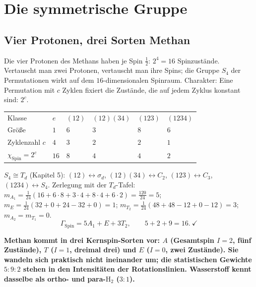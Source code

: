 \chapter{Die symmetrische Gruppe}

\section{Vier Protonen, drei Sorten Methan}

\begin{merksatz}
Die vier Protonen des Methans haben je Spin $\tfrac12$: $2^{4} = 16$ Spinzustände. Vertauscht man zwei Protonen, vertauscht man ihre Spins; die Gruppe $S_4$ der Permutationen wirkt auf dem $16$-dimensionalen Spinraum. Charakter: Eine Permutation mit $c$ Zyklen fixiert die Zustände, die auf jedem Zyklus konstant sind: $2^{c}$.

\begin{center}
{\small
\renewcommand{\arraystretch}{1.46}
\begin{tabular}{@{}P{2.0cm}P{0.8cm}P{1.0cm}P{1.4cm}P{1.0cm}P{1.2cm}@{}}
\toprule
Klasse & $e$ & $(12)$ & $(12)(34)$ & $(123)$ & $(1234)$\\
Größe & $1$ & $6$ & $3$ & $8$ & $6$\\
\midrule
Zyklenzahl $c$ & $4$ & $3$ & $2$ & $2$ & $1$\\
$\chi_{\mathrm{Spin}} = 2^{c}$ & $16$ & $8$ & $4$ & $4$ & $2$\\
\bottomrule
\end{tabular}}
\end{center}
$S_4\cong T_d$ (Kapitel 5): $(12)\leftrightarrow\sigma_d$, $(12)(34)\leftrightarrow C_2$, $(123)\leftrightarrow C_3$, $(1234)\leftrightarrow S_4$. Zerlegung mit der $T_d$-Tafel: $m_{A_1} = \frac1{24}(16 + 6\cdot8 + 3\cdot4 + 8\cdot4 + 6\cdot2) = \frac{120}{24} = 5$; $m_E = \frac1{24}(32 + 0 + 24 - 32 + 0) = 1$; $m_{T_2} = \frac1{24}(48 + 48 - 12 + 0 - 12) = 3$; $m_{A_2} = m_{T_1} = 0$.
\[ \Gamma_{\mathrm{Spin}} = 5A_1 + E + 3T_2,\qquad5 + 2 + 9 = 16 .\ \checkmark \]

\begin{center}
\begin{minipage}{0.9\textwidth}
\textbf{Methan kommt in drei Kernspin-Sorten vor: $A$ (Gesamtspin $I = 2$, fünf Zustände), $T$ ($I = 1$, dreimal drei) und $E$ ($I = 0$, zwei Zustände). Sie wandeln sich praktisch nicht ineinander um; die statistischen Gewichte $5 : 9 : 2$ stehen in den Intensitäten der Rotationslinien. Wasserstoff kennt dasselbe als ortho- und para-$\mathrm{H_2}$ ($3 : 1$).}
\end{minipage}
\end{center}


\end{merksatz}
